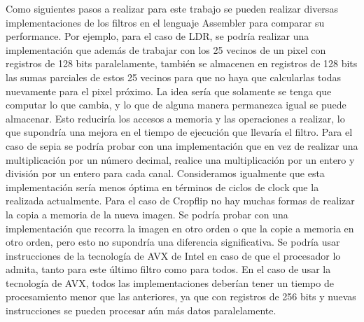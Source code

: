 \documentclass[a4paper]{article}
\newenvironment{codesnippet}{%
	\begin{Sbox}\begin{minipage}{\textwidth}\sffamily\small}%
	{\end{minipage}\end{Sbox}%
		\begin{center}%
		\vspace{-0.4cm}\colorbox{litegrey}{\TheSbox}\end{center}\vspace{0.3cm}}
\begin{document}
Como siguientes pasos a realizar para este trabajo se pueden realizar diversas implementaciones de los filtros en el lenguaje Assembler para comparar su performance. Por ejemplo, para el caso de LDR, se podría realizar una implementación que además de trabajar con los 25 vecinos de un pixel con registros de 128 bits paralelamente, también se almacenen en registros de 128 bits las sumas parciales de estos 25 vecinos para que no haya que calcularlas todas nuevamente para el pixel próximo. La idea sería que solamente se tenga que computar lo que cambia, y lo que de alguna manera permanezca igual se puede almacenar. Esto reduciría los accesos a memoria y las operaciones a realizar, lo que supondría una mejora en el tiempo de ejecución que llevaría el filtro. Para el caso de sepia se podría probar con una implementación que en vez de realizar una multiplicación por un número decimal, realice una multiplicación por un entero y división por un entero para cada canal. Consideramos igualmente que esta implementación sería menos óptima en términos de ciclos de clock que la realizada actualmente. Para el caso de Cropflip no hay muchas formas de realizar la copia a memoria de la nueva imagen. Se podría probar con una implementación que recorra la imagen en otro orden o que la copie a memoria en otro orden, pero esto no supondría una diferencia significativa. Se podría usar instrucciones de la tecnología de AVX de Intel en caso de que el procesador lo admita, tanto para este último filtro como para todos. En el caso de usar la tecnología de AVX, todos las implementaciones deberían tener un tiempo de procesamiento menor que las anteriores, ya que con registros de 256 bits y nuevas instrucciones se pueden procesar aún más datos paralelamente.






\end{document}
